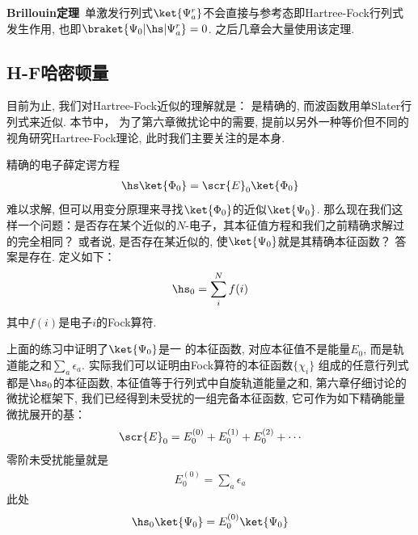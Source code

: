 \textbf{Brillouin定理}\ 单激发行列式$\ket{\Psi_a^r}$不会直接与参考态即Hartree-Fock行列式发生作用, 也即$\braket{\Psi_0|\hs|\Psi_a^r}=0$. 之后几章会大量使用该定理.
\subsection{H-F哈密顿量}
目前为止, 
我们对Hartree-Fock近似的理解就是： \ha 是精确的, 
而波函数用单Slater行列式来近似. 
本节中，
为了第六章微扰论中的需要, 
提前以另外一种等价但不同的视角研究Hartree-Fock理论, 
此时我们主要关注的是\ha 本身.


精确的电子薛定谔方程
\begin{align}
	\hs\ket{\Phi_0} = \scr{E}_0\ket{\Phi_0}
\end{align}
难以求解, 但可以用变分原理来寻找$\ket{\Phi_0}$的近似$\ket{\Psi_0}$. 
那么现在我们这样一个问题：是否存在某个近似的$N$-电子\ha ，其本征值方程和我们之前精确求解过的完全相同？
或者说, 是否存在某近似的\ha, 使$\ket{\Psi_0}$就是其精确本征函数？
答案是存在. \emph{\hft{} \ha}定义如下：
\begin{align}
	\hs_0 = \sum_i^Nf(i)
\end{align}
其中$f(i)是$电子$i$的Fock算符.


上面的练习中证明了$\ket{\Psi_0}$是一\hft{} \ha 的本征函数, 
对应本征值不是\hft 能量$E_0$, 
而是轨道能之和$\sum_a\epsilon_a$. 
实际我们可以证明由Fock算符的本征函数$\{\chi_i\}$ 组成的任意行列式都是$\hs_0$的本征函数, 
本征值等于行列式中自旋轨道能量之和, 
第六章仔细讨论的微扰论框架下, 
我们已经得到未受扰\ha 的一组完备本征函数, 
它可作为如下精确能量微扰展开的基：
\begin{align}
	\label{3.104}
	\scr{E}_0 = E_0^{(0)} + E_0^{(1)} + E_0^{(2)} + \cdots
\end{align}
零阶未受扰能量就是
\begin{align}
	E_0^{(0)} = \sum_a\epsilon_a
\end{align}
此处
\begin{equation}
	\hs_0\ket{\Psi_0}=E_0^{(0)}\ket{\Psi_0}
\end{equation}

